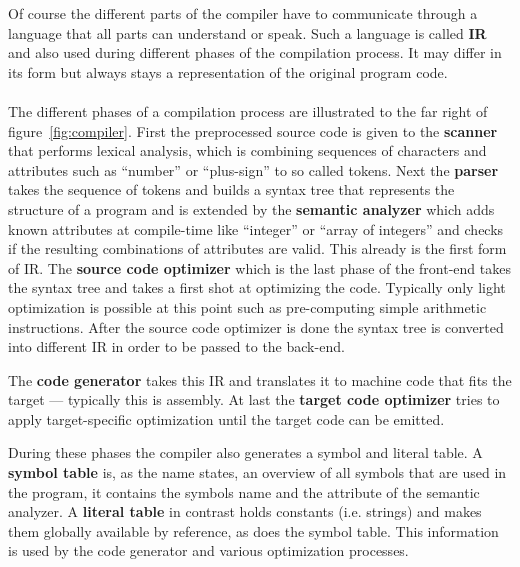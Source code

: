 {Of course the different parts of the compiler have to communicate through a language that all parts can understand or speak.
Such a language is called \textbf{\ac{IR}} and also used during different phases of the compilation process.
It may differ in its form but always stays a representation of the original program code.
\\
\\
The different phases of a compilation process are illustrated to the far right of figure~\ref{fig:compiler}.
First the preprocessed source code is given to the \textbf{scanner} that performs lexical analysis, which is combining sequences of characters and attributes such as ``number'' or ``plus-sign'' to so called tokens.
Next the \textbf{parser} takes the sequence of tokens and builds a syntax tree that represents the structure of a program and is extended by the \textbf{semantic analyzer} which adds known attributes at compile-time like ``integer'' or ``array of integers'' and checks if the resulting combinations of attributes are valid.
This already is the first form of \ac{IR}.
The \textbf{source code optimizer} which is the last phase of the front-end takes the syntax tree and takes a first shot at optimizing the code.
Typically only light optimization is possible at this point such as pre-computing simple arithmetic instructions.
After the source code optimizer is done the syntax tree is converted into different IR in order to be passed to the back-end.

The \textbf{code generator} takes this \ac{IR} and translates it to machine code that fits the target --- typically this is assembly.
At last the \textbf{target code optimizer} tries to apply target-specific optimization until the target code can be emitted.

During these phases the compiler also generates a symbol and literal table.
A \textbf{symbol table} is, as the name states, an overview of all symbols that are used in the program, it contains the symbols name and the attribute of the semantic analyzer.
A \textbf{literal table} in contrast holds constants (i.e. strings) and makes them globally available by reference, as does the symbol table.
This information is used by the code generator and various optimization processes.

}
